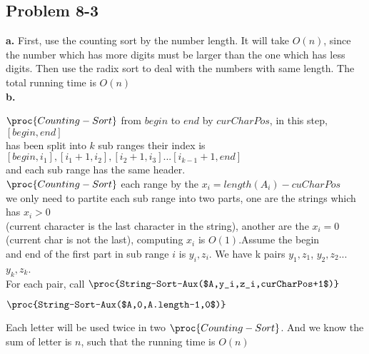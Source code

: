 \documentclass[12pt]{article}
\theoremstyle{definition}
\theoremstyle{remark}
\begin{document}
\subsection*{Problem 8-3}
\textbf{a.} First, use the counting sort by the number length. It will take $O(n)$, since the number which has more digits must be larger than the one which has less digits. Then use the radix sort to deal with the numbers with same length. The total running time is $O(n)$\\
\textbf{b.}
\begin{codebox}
$\proc{Counting-Sort}$ from $begin$ to $end$ by $curCharPos$, in this step, $[begin, end]$\\
has been split into $k$ sub ranges their index is $[begin, i_1],[i_1+1, i_2],[i_2+1,i_3]...[i_{k-1}+1,end]$\\
and each sub range has the same header.\\
$\proc{Counting-Sort}$ each range by the $x_i=length(A_i)-cuCharPos$\\
we only need to partite each sub range into two parts, one are the strings which has $x_i>0$\\
(current character is the last character in the string), another are the $x_i=0$\\
(current char is not the last), computing $x_i$ is $O(1)$.Assume the begin\\
and end of the first part in sub range $i$ is $y_i,z_i$. We have k pairs $y_1,z_1$, $y_2,z_2$...$y_k,z_k$.\\
For each pair, call $\proc{String-Sort-Aux($A,y_i,z_i,curCharPos+1$)}$
\end{codebox}
\begin{codebox}
\li $\proc{String-Sort-Aux($A,0,A.length-1,0$)}$
\end{codebox}
Each letter will be used twice in two $\proc{Counting-Sort}$. And we know the sum of letter is $n$, such that the running time is $O(n)$
\end{document}
